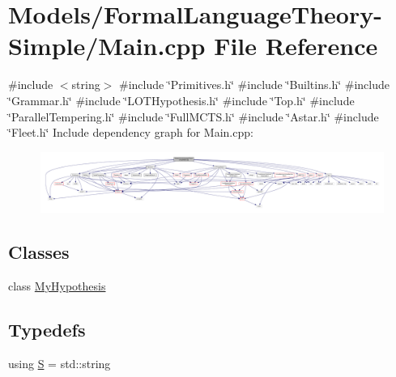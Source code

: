 \hypertarget{_formal_language_theory-_simple_2_main_8cpp}{}\section{Models/\+Formal\+Language\+Theory-\/\+Simple/\+Main.cpp File Reference}
\label{_formal_language_theory-_simple_2_main_8cpp}
{\ttfamily \#include $<$string$>$}\newline
{\ttfamily \#include \char`\"{}Primitives.\+h\char`\"{}}\newline
{\ttfamily \#include \char`\"{}Builtins.\+h\char`\"{}}\newline
{\ttfamily \#include \char`\"{}Grammar.\+h\char`\"{}}\newline
{\ttfamily \#include \char`\"{}L\+O\+T\+Hypothesis.\+h\char`\"{}}\newline
{\ttfamily \#include \char`\"{}Top.\+h\char`\"{}}\newline
{\ttfamily \#include \char`\"{}Parallel\+Tempering.\+h\char`\"{}}\newline
{\ttfamily \#include \char`\"{}Full\+M\+C\+T\+S.\+h\char`\"{}}\newline
{\ttfamily \#include \char`\"{}Astar.\+h\char`\"{}}\newline
{\ttfamily \#include \char`\"{}Fleet.\+h\char`\"{}}\newline
Include dependency graph for Main.\+cpp\+:
\nopagebreak
\begin{figure}[H]
\begin{center}
\leavevmode
\includegraphics[width=350pt]{_formal_language_theory-_simple_2_main_8cpp__incl}
\end{center}
\end{figure}
\subsection*{Classes}
\begin{DoxyCompactItemize}
\item 
class \hyperlink{class_my_hypothesis}{My\+Hypothesis}
\end{DoxyCompactItemize}
\subsection*{Typedefs}
\begin{DoxyCompactItemize}
\item 
using \hyperlink{_formal_language_theory-_simple_2_main_8cpp_a51c40915539205f0b5add30b0d68a4cb}{S} = std\+::string
\end{DoxyCompactItemize}
